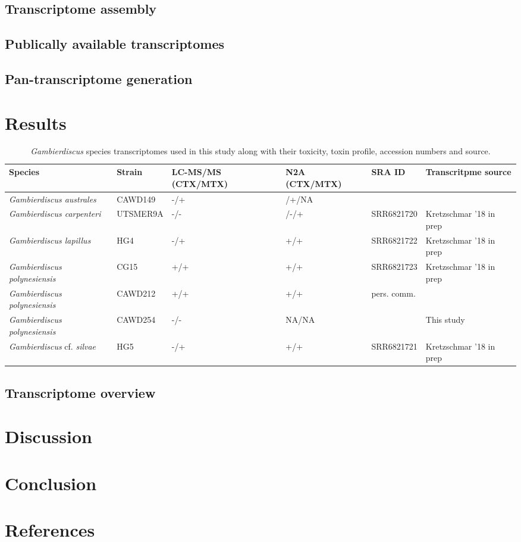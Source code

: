 \documentclass[12pt]{article}
\begin{document}
\subsection*{Transcriptome assembly}

\subsection*{Publically available transcriptomes}

\subsection*{Pan-transcriptome generation}
\newpage
\section*{Results}
\FloatBarrier
\begin{table}
\caption{\emph{Gambierdiscus} species transcriptomes used in this study along with their toxicity, toxin profile, accession numbers and source.}
\begin{tabular}{ | p{3cm} | p{2cm} | p{2.5cm} | p{2.5cm} | p{2cm} | p{2cm}|}
\hline
\textbf{Species} & \textbf{Strain}& \textbf{LC-MS/MS (CTX/MTX)} & \textbf{N2A (CTX/MTX)} & \textbf{SRA ID} & \textbf{Transcritpme source} \\
\hline
\textit{Gambierdiscus australes}&CAWD149&-/+&/+/NA&&\cite{keeling2014marine}\\
\hline
\textit{Gambierdiscus carpenteri}&UTSMER9A&-/-&/-/+&SRR6821720
&Kretzschmar '18 in prep\\
\hline
\textit{Gambierdiscus lapillus}&HG4&-/+&+/+&SRR6821722
&Kretzschmar '18 in prep\\
\hline
\textit{Gambierdiscus polynesiensis}&CG15&+/+&+/+&SRR6821723
&Kretzschmar '18 in prep\\
\hline
\textit{Gambierdiscus polynesiensis}&CAWD212&+/+&+/+&pers. comm.&\cite{kohli2017role}\\
\hline
\textit{Gambierdiscus polynesiensis}&CAWD254&-/-&NA/NA&&This study\\
\hline
\textit{Gambierdiscus} cf. \textit{silvae}&HG5&-/+&+/+&SRR6821721
&Kretzschmar '18 in prep\\
\hline
\end{tabular}
\end{table}
\FloatBarrier

\subsection*{Transcriptome overview}
\newpage
\section*{Discussion}

\newpage
\section*{Conclusion}

\newpage
\section*{References}

\newpage


\end{document}
